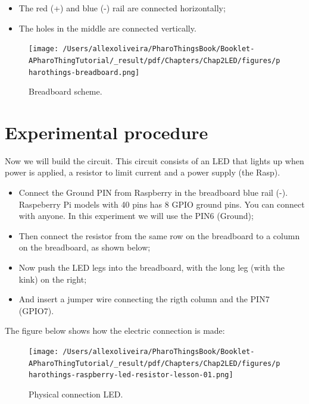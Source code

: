 \documentclass[10pt,twoside,english]{_support/latex/sbabook/sbabook}
\begin{document}
\begin{itemize}
\item The red (+) and blue (-) rail are connected horizontally;
\item The holes in the middle are connected vertically.
\end{itemize}


\begin{figure}

\begin{center}
\texttt{[image: /Users/allexoliveira/PharoThingsBook/Booklet-APharoThingTutorial/\_result/pdf/Chapters/Chap2LED/figures/pharothings-breadboard.png]}\caption{Breadboard scheme.\label{Breadboard}}\end{center}
\end{figure}

\section{Experimental procedure}
Now we will build the circuit. This circuit consists of an LED that lights up when power is applied, a resistor to limit current and a power supply (the Rasp).

\begin{itemize}
\item Connect the Ground PIN from Raspberry in the breadboard blue rail (-). Raspeberry Pi models with 40 pins has 8 GPIO ground pins. You can connect with anyone. In this experiment we will use the PIN6 (Ground);
\item Then connect the resistor from the same row on the breadboard to a column on the breadboard, as shown below;
\item Now push the LED legs into the breadboard, with the long leg (with the kink) on the right;
\item And insert a jumper wire connecting the rigth column and the PIN7 (GPIO7).
\end{itemize}

The figure below shows how the electric connection is made:


\begin{figure}

\begin{center}
\texttt{[image: /Users/allexoliveira/PharoThingsBook/Booklet-APharoThingTutorial/\_result/pdf/Chapters/Chap2LED/figures/pharothings-raspberry-led-resistor-lesson-01.png]}\caption{Physical connection LED.\label{physicalLed}}\end{center}
\end{figure}
\end{document}
